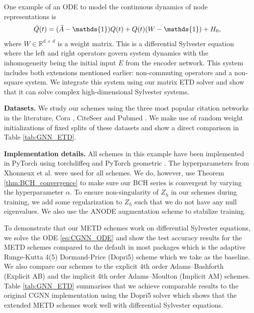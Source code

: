\documentclass[12pt]{article}
\begin{document}
One example of an ODE to model the continuous dynamics of node representations is 
\begin{equation}
    \label{eq:CGNN_ODE}
    \dot Q(t) = (\Tilde{A}- \mathds{1}) Q(t) + Q(t)( W - \mathds{1}) + H_0,
\end{equation}
where $W \in \mathbb{R}^{ d\, \times \, d}$ is a weight matrix. This is a differential Sylvester equation where the left and right operators govern system dynamics with the inhomogeneity being the initial input $E$ from the encoder network. This system includes both extensions mentioned earlier: non-commuting operators and a non-square system. We integrate this system using our matrix ETD solver and show that it can solve complex high-dimensional Sylvester systems.

\textbf{Datasets.}   We study our schemes using the three most popular citation networks in the literature, Cora \cite{mccallum2000automating}, CiteSeer \cite{sen2008collective} and Pubmed \cite{namata2012query}. We make use of random weight initializations of fixed splits of these datasets and show a direct comparison in Table \ref{tab:GNN_ETD}.

\textbf{Implementation details.} All schemes in this example have been implemented in PyTorch \cite{paszke2019pytorch} using torchdiffeq \cite{chen2018neural} and PyTorch geometric \cite{fey2019fast}. The hyperparameters from Xhonneux et al. \cite{pmlr-v119-xhonneux20a} were used for all schemes. We do, however, use Theorem \ref{thm:BCH_convergence} to make sure our BCH series is convergent by varying the hyperparameter $\alpha$. To ensure non-singularity of $Z_h$ in our schemes during training, we add some regularization to $Z_h$ such that we do not have any null eigenvalues. We also use the ANODE augmentation scheme \cite{anode} to stabilize training. 


To demonstrate that our METD schemes work on differential Sylvester equations, we solve the ODE \eqref{eq:CGNN_ODE} and show the test accuracy results for the METD schemes compared to the default in most packages which is the adaptive Runge-Kutta 4(5) Dormand-Price (Dopri5) scheme which we take as the baseline. We also compare our schemes to the explicit 4th order Adams–Bashforth (Explicit AB) and the implicit 4th order Adams–Moulton (Implicit AM) schemes. Table \ref{tab:GNN_ETD} summarises that we achieve comparable results to the original CGNN implementation using the Dopri5 solver which shows that the extended METD schemes work well with differential Sylvester equations. 
\end{document}
